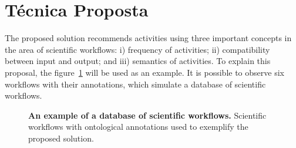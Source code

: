 \documentclass[10pt,letterpaper]{article}
\begin{document}
%


\section*{Técnica Proposta}
The proposed solution recommends activities using three important concepts in the area of ​​scientific workflows: i) frequency of activities; ii) compatibility between input and output; and iii) semantics of activities. To explain this proposal, the figure~\ref{FIGURA_ONTOLOGIA_CONSTRUIDA2} will be used as an example. It is possible to observe six workflows with their annotations, which simulate a database of scientific workflows.
\begin{figure}[!h]
	\caption{{\bf An example of a database of scientific workflows.}
Scientific workflows with ontological annotations used to exemplify the proposed solution.}
	\label{FIGURA_ONTOLOGIA_CONSTRUIDA2}
\end{figure}
\end{document}
